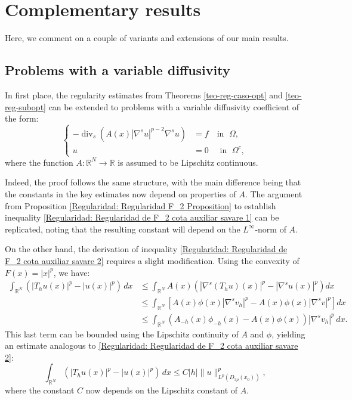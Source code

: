 \documentclass[]{amsart}
\theoremstyle{definition}
\theoremstyle{definition}
\theoremstyle{remark}
\numberwithin{equation}{section}
\begin{document}
    
\section{Complementary results} \label{sec:complementary}
Here, we comment on a couple of variants and extensions of our main results.

\subsection{Problems with a variable diffusivity}
In first place, the regularity estimates from Theorems \ref{teo-reg-caso-opt} and \ref{teo-reg-subopt} can be extended to problems with a variable diffusivity coefficient of the form:
		\begin{equation}
	\label{Regularidad:Problema Dirichlet difusividad variable}
			\left\{
			\begin{aligned}
				-\operatorname{div}_{s}\left( A(x)|\nabla^{s} u|^{p-2} \nabla^{s} u\right) &= f\quad\text{in } \; \Omega, \\
				u &= 0 \quad\text{ in } \; \Omega^c,
			\end{aligned}
			\right.
		\end{equation}
where the function \( A: \mathbb{R}^N \rightarrow \mathbb{R} \) is assumed to be Lipschitz continuous.
		
Indeed, the proof follows the same structure, with the main difference being that the constants in the key estimates now depend on properties of \(A\). The argument from Proposition \ref{Regularidad: Regularidad F_2 Proposition} to establish inequality \eqref{Regularidad: Regularidad de F_2 cota auxiliar savare 1} can be replicated, noting that the resulting constant will depend on the \(L^\infty\)-norm of \(A\).
		
	On the other hand, the derivation of inequality \eqref{Regularidad: Regularidad de F_2 cota auxiliar savare 2} requires a slight modification. Using the convexity of \( F(x) = |x|^p \), we have:
		\begin{align*}
			\int_{\mathbb{R}^N} \left( |T_h u(x)|^{p} - |u(x)|^{p} \right) \, dx  
			&\leq \int_{\mathbb{R}^N}
            A(x) \left( |\nabla^s (T_h u)(x)|^p - |\nabla^s u(x)|^p \right) dx \\
			&\leq \int_{\mathbb{R}^N}\left[ A(x) \phi(x) | \nabla^s v_h |^p - A(x) \phi(x)|\nabla^s v|^p \right] dx \\
			&\leq \int_{\mathbb{R}^N}
            \left( A_{-h}(x) \phi_{-h}(x) - A(x) \phi(x) \right) | \nabla^s v_h |^p \, dx.
		\end{align*}
		This last term can be bounded using the Lipschitz continuity of \(A\) and \(\phi\), yielding an estimate analogous to \eqref{Regularidad: Regularidad de F_2 cota auxiliar savare 2}:
		\begin{equation}
			\int_{\mathbb{R}^N} \left( |T_h u(x)|^p - |u(x)|^p \right) \, dx \leq C |h| \|u\|_{L^{p}(D_{3\rho}(x_0))}^p,
		\end{equation}
		where the constant \(C\) now depends on the Lipschitz constant of \(A\). 
		
\end{document}
